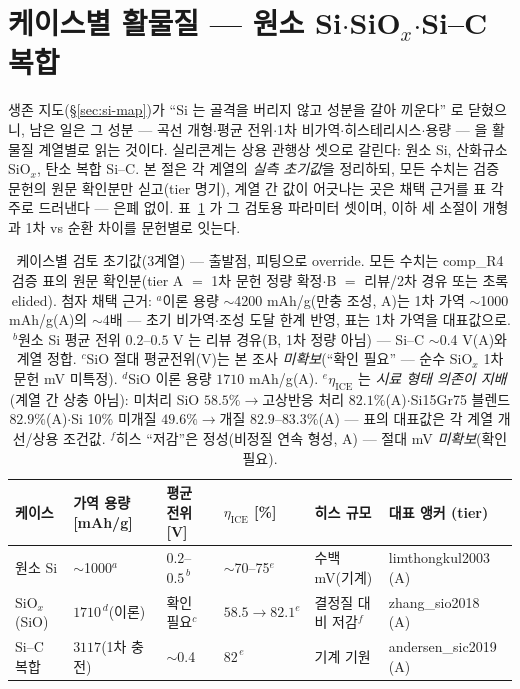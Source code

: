 \section{케이스별 활물질 --- 원소 Si$\cdot$SiO$_x$$\cdot$Si--C 복합}\label{sec:si-cases}
생존 지도(\S\ref{sec:si-map})가 ``Si 는 골격을 버리지 않고 성분을 갈아 끼운다'' 로 닫혔으니, 남은 일은
그 성분 --- 곡선 개형$\cdot$평균 전위$\cdot$1차 비가역$\cdot$히스테리시스$\cdot$용량 --- 을 활물질 계열별로
읽는 것이다. 실리콘계는 상용 관행상 셋으로 갈린다: 원소 Si, 산화규소 SiO$_x$, 탄소 복합 Si--C. 본 절은 각
계열의 \emph{실측 초기값}을 정리하되, 모든 수치는 검증 문헌의 원문 확인분만 싣고(tier 명기), 계열 간 값이
어긋나는 곳은 채택 근거를 표 각주로 드러낸다 --- 은폐 없이. 표~\ref{tab:si-cases} 가 그 검토용 파라미터
셋이며, 이하 세 소절이 개형과 1차 vs 순환 차이를 문헌별로 잇는다.

\begin{table}[t]
\centering\footnotesize
\renewcommand{\arraystretch}{1.3}
\caption{케이스별 검토 초기값(3계열) --- 출발점, 피팅으로 override. 모든 수치는 comp\_R4 검증 표의 원문
확인분(tier A $=$ 1차 문헌 정량 확정$\cdot$B $=$ 리뷰/2차 경유 또는 초록 elided). 첨자 채택 근거:
$^a$이론 용량 $\sim$4200 mAh/g(만충 조성\cite{wen_huggins1981}, A)는 1차 가역 $\sim$1000
mAh/g\cite{limthongkul2003}(A)의 $\sim$4배 --- 초기 비가역$\cdot$조성 도달 한계 반영, 표는 1차 가역을
대표값으로. $^b$원소 Si 평균 전위 $0.2$--$0.5$ V 는 리뷰 경유\cite{obrovac_chevrier2014}(B, 1차 정량
아님) --- Si--C $\sim$0.4 V\cite{andersen_sic2019}(A)와 계열 정합. $^c$SiO 절대 평균전위(V)는 본 조사
\emph{미확보}(``확인 필요'' --- 순수 SiO$_x$ 1차 문헌 mV 미특정). $^d$SiO 이론 용량 $1710$
mAh/g\cite{zhang_sio2018}(A). $^e$$\eta_\mathrm{ICE}$ 는 \emph{시료 형태 의존이 지배}(계열 간 상충
아님): 미처리 SiO $58.5\%\to$고상반응 처리 $82.1\%$\cite{yom_sio2016}(A)$\cdot$Si15Gr75 블렌드
$82.9\%$\cite{gautam_blend2024}(A)$\cdot$Si 10\% 미개질 $49.6\%\to$개질 $82.9$--$83.3\%$\cite{naboka_sic2021}(A)
--- 표의 대표값은 각 계열 개선/상용 조건값. $^f$히스 ``저감''은 정성(비정질 연속 형성\cite{kitada_sio2019},
A) --- 절대 mV \emph{미확보}(확인 필요).}
\label{tab:si-cases}
\begin{tabular}{@{}p{} p{} p{} p{} p{} p{}@{}}
\toprule
케이스 & 가역 용량 [mAh/g] & 평균 전위 [V] & $\eta_\mathrm{ICE}$ [\%] & 히스 규모 & 대표 앵커 (tier) \\
\midrule
원소 Si       & $\sim$1000$^a$      & $0.2$--$0.5^{\,b}$ & $\sim$70--75$^e$ & 수백 mV(기계)     & limthongkul2003 (A) \\
SiO$_x$ (SiO) & $1710^{\,d}$(이론)   & 확인 필요$^c$      & $58.5\to82.1^e$  & 결정질 대비 저감$^f$ & zhang\_sio2018 (A) \\
Si--C 복합    & $3117$(1차 충전)     & $\sim$0.4          & $82^{\,e}$       & 기계 기원          & andersen\_sic2019 (A) \\
\bottomrule
\end{tabular}
\end{table}

